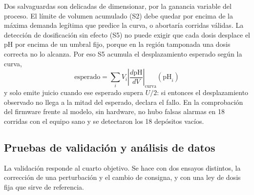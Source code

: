 Dos salvaguardas son delicadas de dimensionar, por la ganancia variable del proceso. El límite de volumen acumulado (S2) debe quedar por encima de la máxima demanda legítima que predice la curva, o abortaría corridas válidas. La detección de dosificación sin efecto (S5) no puede exigir que cada dosis desplace el pH por encima de un umbral fijo, porque en la región tamponada una dosis correcta no lo alcanza. Por eso S5 acumula el desplazamiento esperado según la curva,
\begin{equation}
\text{esperado}=\sum_i V_i\left|\frac{d\mathrm{pH}}{dV}\right|_{\text{curva}}(\mathrm{pH}_i)\label{eq:esperado}
\end{equation}
y solo emite juicio cuando ese esperado supera $U/2$: si entonces el desplazamiento observado no llega a la mitad del esperado, declara el fallo. En la comprobación del firmware frente al modelo, sin hardware, no hubo falsas alarmas en 18 corridas con el equipo sano y se detectaron los 18 depósitos vacíos.

\subsection{Pruebas de validación y análisis de datos}\label{sec:val}

La validación responde al cuarto objetivo. Se hace con dos ensayos distintos, la corrección de una perturbación y el cambio de consigna, y con una ley de dosis fija que sirve de referencia.

